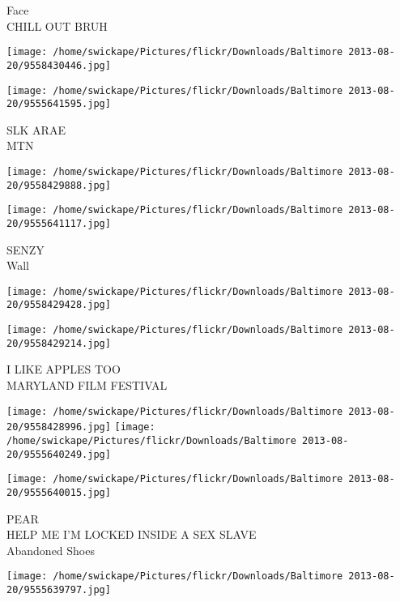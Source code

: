 \documentclass[10pt,letterpaper]{article}
\begin{document}
Face\\
CHILL OUT BRUH\\
\pagebreak

\texttt{[image: /home/swickape/Pictures/flickr/Downloads/Baltimore 2013-08-20/9558430446.jpg]}

\vspace{0.25in}
\texttt{[image: /home/swickape/Pictures/flickr/Downloads/Baltimore 2013-08-20/9555641595.jpg]}

SLK ARAE\\
MTN\\
\pagebreak

\texttt{[image: /home/swickape/Pictures/flickr/Downloads/Baltimore 2013-08-20/9558429888.jpg]}

\vspace{0.25in}
\texttt{[image: /home/swickape/Pictures/flickr/Downloads/Baltimore 2013-08-20/9555641117.jpg]}

SENZY\\
Wall\\
\pagebreak

\texttt{[image: /home/swickape/Pictures/flickr/Downloads/Baltimore 2013-08-20/9558429428.jpg]}

\vspace{0.25in}
\texttt{[image: /home/swickape/Pictures/flickr/Downloads/Baltimore 2013-08-20/9558429214.jpg]}

I LIKE APPLES TOO\\
MARYLAND FILM FESTIVAL\\
\pagebreak

\texttt{[image: /home/swickape/Pictures/flickr/Downloads/Baltimore 2013-08-20/9558428996.jpg]}
\texttt{[image: /home/swickape/Pictures/flickr/Downloads/Baltimore 2013-08-20/9555640249.jpg]}

\vspace{0.25in}
\texttt{[image: /home/swickape/Pictures/flickr/Downloads/Baltimore 2013-08-20/9555640015.jpg]}

PEAR\\
HELP ME I'M LOCKED INSIDE A SEX SLAVE\\
Abandoned Shoes\\
\pagebreak

\texttt{[image: /home/swickape/Pictures/flickr/Downloads/Baltimore 2013-08-20/9555639797.jpg]}
\end{document}
